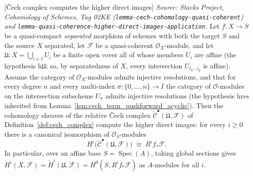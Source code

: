 \begin{lemma}

[{\v C}ech complex computes the higher direct images]
  \label{lem:cech_computes_cohomology}
  \textit{Source: Stacks Project, Cohomology of Schemes, Tag 02KE
  (\texttt{lemma-cech-cohomology-quasi-coherent}) and
  \texttt{lemma-quasi-coherence-higher-direct-images-application}.}
  Let \(f : X \to S\) be a quasi-compact \emph{separated} morphism of schemes with
  both the target \(S\) and the source \(X\) separated, let \(\mathcal{F}\) be a
  quasi-coherent \(\mathcal{O}_X\)-module, and let
  \(\mathfrak{U} : X = \bigcup_{i \in I} U_i\) be a finite open cover all of whose
  members \(U_i\) are affine (the hypothesis \(\mathrm{h}\mathfrak{U}\); so, by
  separatedness of \(X\), every intersection \(U_{i_0 \ldots i_p}\) is affine).
  Assume the category of \(\mathcal{O}_X\)-modules admits injective resolutions, and
  that for every degree \(n\) and every multi-index \(\sigma : \{0, \ldots, n\} \to I\)
  the category of \(\mathcal{O}\)-modules on the intersection subscheme \(U_\sigma\)
  admits injective resolutions (the hypothesis \(\mathrm{hres}\) inherited from
  Lemma~\ref{lem:cech_term_pushforward_acyclic}). Then the cohomology sheaves of the
  relative {\v C}ech complex \(\check{\mathcal{C}}^\bullet(\mathfrak{U}, \mathcal{F})\)
  of Definition~\ref{def:cech_complex} compute the higher direct images: for every
  \(i \geq 0\) there is a canonical isomorphism of \(\mathcal{O}_S\)-modules
  \[
    H^i\bigl(\check{\mathcal{C}}^\bullet(\mathfrak{U}, \mathcal{F})\bigr)
      \;\cong\; R^i f_*\mathcal{F}.
  \]
  In particular, over an affine base \(S = \operatorname{Spec}(A)\), taking global
  sections gives \(H^i(X, \mathcal{F}) = \check{H}^i(\mathfrak{U}, \mathcal{F}) =
  H^0(S, R^i f_*\mathcal{F})\) as \(A\)-modules for all \(i\).


\end{lemma}
